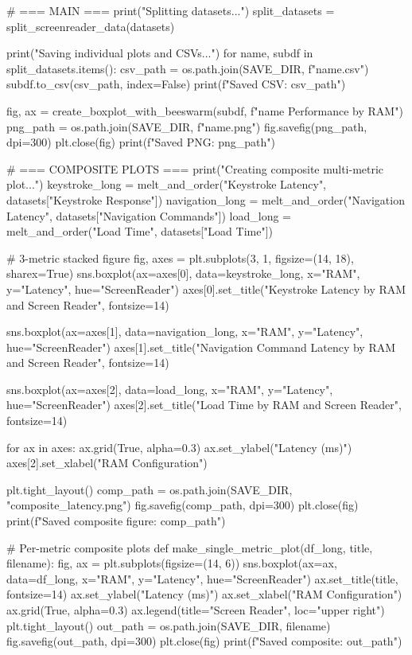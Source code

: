 \begin{pyverbatim}
# === MAIN ===
print("Splitting datasets...")
split_datasets = split_screenreader_data(datasets)

print("Saving individual plots and CSVs...")
for name, subdf in split_datasets.items():
    csv_path = os.path.join(SAVE_DIR, f"{name}.csv")
    subdf.to_csv(csv_path, index=False)
    print(f"Saved CSV: {csv_path}")

    fig, ax = create_boxplot_with_beeswarm(subdf, f"{name} Performance by RAM")
    png_path = os.path.join(SAVE_DIR, f"{name}.png")
    fig.savefig(png_path, dpi=300)
    plt.close(fig)
    print(f"Saved PNG: {png_path}")

# === COMPOSITE PLOTS ===
print("Creating composite multi-metric plot...")
keystroke_long = melt_and_order("Keystroke Latency", datasets["Keystroke Response"])
navigation_long = melt_and_order("Navigation Latency", datasets["Navigation Commands"])
load_long = melt_and_order("Load Time", datasets["Load Time"])

# 3-metric stacked figure
fig, axes = plt.subplots(3, 1, figsize=(14, 18), sharex=True)
sns.boxplot(ax=axes[0], data=keystroke_long, x="RAM", y="Latency", hue="ScreenReader")
axes[0].set_title("Keystroke Latency by RAM and Screen Reader", fontsize=14)

sns.boxplot(ax=axes[1], data=navigation_long, x="RAM", y="Latency", hue="ScreenReader")
axes[1].set_title("Navigation Command Latency by RAM and Screen Reader", fontsize=14)

sns.boxplot(ax=axes[2], data=load_long, x="RAM", y="Latency", hue="ScreenReader")
axes[2].set_title("Load Time by RAM and Screen Reader", fontsize=14)

for ax in axes:
    ax.grid(True, alpha=0.3)
    ax.set_ylabel("Latency (ms)")
axes[2].set_xlabel("RAM Configuration")

plt.tight_layout()
comp_path = os.path.join(SAVE_DIR, "composite_latency.png")
fig.savefig(comp_path, dpi=300)
plt.close(fig)
print(f"Saved composite figure: {comp_path}")

# Per-metric composite plots
def make_single_metric_plot(df_long, title, filename):
    fig, ax = plt.subplots(figsize=(14, 6))
    sns.boxplot(ax=ax, data=df_long, x="RAM", y="Latency", hue="ScreenReader")
    ax.set_title(title, fontsize=14)
    ax.set_ylabel("Latency (ms)")
    ax.set_xlabel("RAM Configuration")
    ax.grid(True, alpha=0.3)
    ax.legend(title="Screen Reader", loc="upper right")
    plt.tight_layout()
    out_path = os.path.join(SAVE_DIR, filename)
    fig.savefig(out_path, dpi=300)
    plt.close(fig)
    print(f"Saved composite: {out_path}")


\end{pyverbatim}
